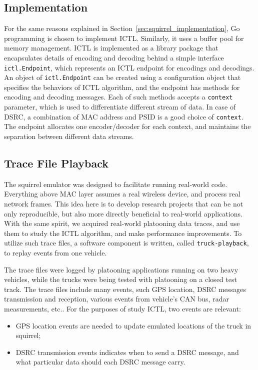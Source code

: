 \documentclass[12pt]{report}
\begin{document}
\subsection{Implementation}

For the same reasons explained in Section~\ref{sec:squirrel_implementation}, Go programming is chosen to implement ICTL. Similarly, it uses a buffer pool for memory management. ICTL is implemented as a library package that encapsulates details of encoding and decoding behind a simple interface \texttt{ictl.Endpoint}, which represents an ICTL endpoint for encodings and decodings. An object of \texttt{ictl.Endpoint} can be created using a configuration object that specifies the behaviors of ICTL algorithm, and the endpoint has methods for encoding and decoding messages. Each of such methods accepts a \texttt{context} parameter, which is used to differentiate different stream of data. In case of DSRC, a combination of MAC address and PSID is a good choice of \texttt{context}. The endpoint allocates one encoder/decoder for each context, and maintains the separation between different data streams.

\subsection{Trace File Playback}

The squirrel emulator was designed to facilitate running real-world code. Everything above MAC layer assumes a real wireless device, and process real network frames. This idea here is to develop research projects that can be not only reproducible, but also more directly beneficial to real-world applications. With the same spirit, we acquired real-world platooning data traces, and use them to study the ICTL algorithm, and make performance improvements. To utilize such trace files, a software component is written, called \texttt{truck-playback}, to replay events from one vehicle.

The trace files were logged by platooning applications running on two heavy vehicles, while the trucks were being tested with platooning on a closed test track. The trace files include many events, such GPS location, DSRC messages transmission and reception, various events from vehicle's CAN bus, radar measurements, etc.. For the purposes of study ICTL, two events are relevant:

\begin{itemize}
  \item GPS location events are needed to update emulated locations of the truck in squirrel;
  \item DSRC transmission events indicates when to send a DSRC message, and what particular data should each DSRC message carry.
\end{itemize}
\end{document}
